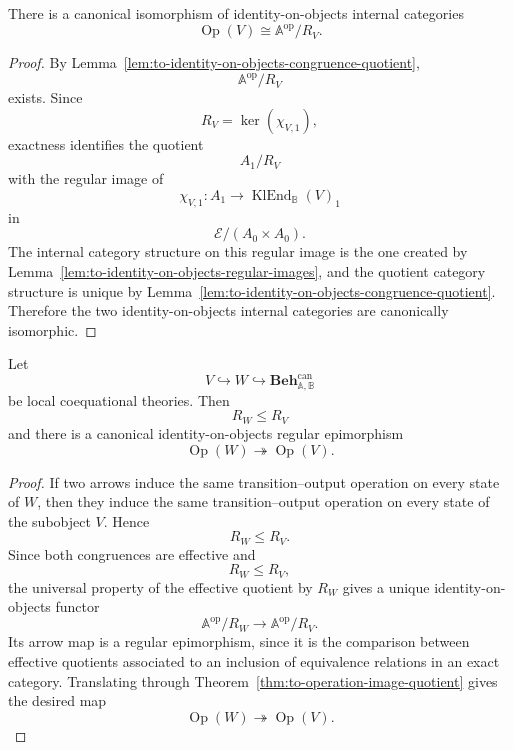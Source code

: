 \begin{theorem}
\label{thm:to-operation-image-quotient}
    There is a canonical isomorphism of identity-on-objects internal categories
    \[
        \operatorname{Op}(V)
        \cong
        \mathbb A^{\mathrm{op}}/R_V.
    \]
\end{theorem}

\begin{proof}
    By Lemma~\ref{lem:to-identity-on-objects-congruence-quotient},
    \[
        \mathbb A^{\mathrm{op}}/R_V
    \]
    exists. Since
    \[
        R_V=\ker(\chi_{V,1}),
    \]
    exactness identifies the quotient
    \[
        A_1/R_V
    \]
    with the regular image of
    \[
        \chi_{V,1}:A_1\to\operatorname{KlEnd}_{\mathbb B}(V)_1
    \]
    in
    \[
        \mathcal E/(A_0\times A_0).
    \]
    The internal category structure on this regular image is the one created
    by Lemma~\ref{lem:to-identity-on-objects-regular-images}, and the quotient
    category structure is unique by
    Lemma~\ref{lem:to-identity-on-objects-congruence-quotient}. Therefore the
    two identity-on-objects internal categories are canonically isomorphic.
\end{proof}

\begin{proposition}
\label{prop:to-operation-image-contravariant}
    Let
    \[
        V\hookrightarrow W\hookrightarrow
        \mathbf{Beh}^{\mathrm{can}}_{\mathbb A,\mathbb B}
    \]
    be local coequational theories. Then
    \[
        R_W\leq R_V
    \]
    and there is a canonical identity-on-objects regular epimorphism
    \[
        \operatorname{Op}(W)\twoheadrightarrow \operatorname{Op}(V).
    \]
\end{proposition}

\begin{proof}
    If two arrows induce the same transition--output operation on every state
    of \(W\), then they induce the same transition--output operation on every
    state of the subobject \(V\). Hence
    \[
        R_W\leq R_V.
    \]
    Since both congruences are effective and
    \[
        R_W\leq R_V,
    \]
    the universal property of the effective quotient by \(R_W\) gives a unique
    identity-on-objects functor
    \[
        \mathbb A^{\mathrm{op}}/R_W
        \to
        \mathbb A^{\mathrm{op}}/R_V.
    \]
    Its arrow map is a regular epimorphism, since it is the comparison between
    effective quotients associated to an inclusion of equivalence relations in
    an exact category. Translating through
    Theorem~\ref{thm:to-operation-image-quotient} gives the desired map
    \[
        \operatorname{Op}(W)\twoheadrightarrow \operatorname{Op}(V).
    \]
\end{proof}

